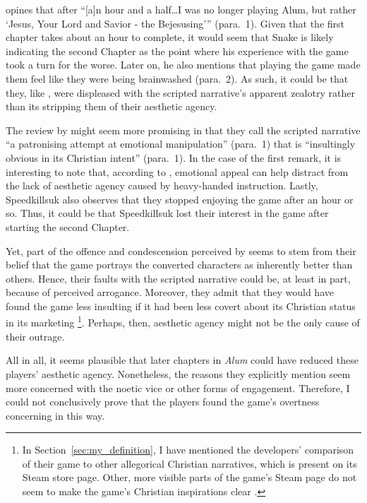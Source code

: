 \textcite{snake_review_2016} opines that after ``[a]n hour and a half\dots I was no longer playing Alum, but rather `Jesus, Your Lord and Savior - the Bejesusing''' (para.~1). Given that the first chapter takes about an hour to complete, it would seem that Snake is likely indicating the second Chapter as the point where his experience with the game took a turn for the worse. Later on, he also mentions that playing the game made them feel like they were being brainwashed (para.~2). As such, it could be that they, like \textcite{adam_review_2015}, were displeased with the scripted narrative's apparent zealotry rather than its stripping them of their aesthetic agency.

The review by \textcite{speedkillsuk_review_2017} might seem more promising in that they call the scripted narrative ``a patronising attempt at emotional manipulation'' (para.~1) that is ``insultingly obvious in its Christian intent'' (para.~1). In the case of the first remark, it is interesting to note that, according to \textcite[footnote 13]{king_virtue_2017}, emotional appeal can help distract from the lack of aesthetic agency caused by heavy-handed instruction. Lastly, Speedkillsuk also observes that they stopped enjoying the game after an hour or so. Thus, it could be that Speedkillsuk lost their interest in the game after starting the second Chapter.

Yet, part of the offence and condescension perceived by \textcite{speedkillsuk_review_2017} seems to stem from their belief that the game portrays the converted characters as inherently better than others. Hence, their faults with the scripted narrative could be, at least in part, because of perceived arrogance. Moreover, they admit that they would have found the game less insulting if it had been less covert about its Christian status in its marketing \footnote{In Section~\ref{sec:my_definition}, I have mentioned the developers' comparison of their game to other allegorical Christian narratives, which is present on its Steam store page. Other, more visible parts of the game's Steam page do not seem to make the game's Christian inspirations clear \parencite{crashable_studios_alum_2015}.}. Perhaps, then, aesthetic agency might not be the only cause of their outrage.

All in all, it seems plausible that later chapters in \textit{Alum} \parencite{orsie_alum_2006} could have reduced these players' aesthetic agency. Nonetheless, the reasons they explicitly mention seem more concerned with the noetic vice or other forms of engagement. Therefore, I could not conclusively prove that the players found the game's overtness concerning in this way.

